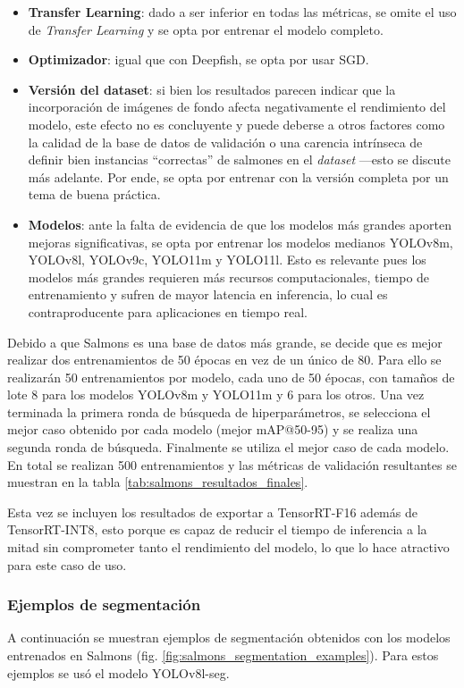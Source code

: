 \begin{itemize}
    \setlength{\itemsep}{0pt}%
    \item \textbf{Transfer Learning}: dado a ser inferior en todas las métricas, se omite el uso de \textit{Transfer Learning} y se opta por entrenar el modelo completo.
    \item \textbf{Optimizador}: igual que con Deepfish, se opta por usar SGD.
    \item \textbf{Versión del dataset}: si bien los resultados parecen indicar que la incorporación de imágenes de fondo afecta negativamente el rendimiento del modelo, este efecto no es concluyente y puede deberse a otros factores como la calidad de la base de datos de validación o una carencia intrínseca de definir bien instancias ``correctas'' de salmones en el \textit{dataset} ---esto se discute más adelante. Por ende, se opta por entrenar con la versión completa por un tema de buena práctica.
    \item \textbf{Modelos}: ante la falta de evidencia de que los modelos más grandes aporten mejoras significativas, se opta por entrenar los modelos medianos YOLOv8m, YOLOv8l, YOLOv9c, YOLO11m y YOLO11l. Esto es relevante pues los modelos más grandes requieren más recursos computacionales, tiempo de entrenamiento y sufren de mayor latencia en inferencia, lo cual es contraproducente para aplicaciones en tiempo real.
\end{itemize}

Debido a que Salmons es una base de datos más grande, se decide que es mejor realizar dos entrenamientos de 50 épocas en vez de un único de 80. Para ello se realizarán 50 entrenamientos por modelo, cada uno de 50 épocas, con tamaños de lote 8 para los modelos YOLOv8m y YOLO11m y 6 para los otros. Una vez terminada la primera ronda de búsqueda de hiperparámetros, se selecciona el mejor caso obtenido por cada modelo (mejor mAP@50-95) y se realiza una segunda ronda de búsqueda. Finalmente se utiliza el mejor caso de cada modelo. En total se realizan 500 entrenamientos y las métricas de validación resultantes se muestran en la tabla \ref{tab:salmons_resultados_finales}.

Esta vez se incluyen los resultados de exportar a TensorRT-F16 además de TensorRT-INT8, esto porque es capaz de reducir el tiempo de inferencia a la mitad sin comprometer tanto el rendimiento del modelo, lo que lo hace atractivo para este caso de uso.

\subsubsection{Ejemplos de segmentación}
A continuación se muestran ejemplos de segmentación obtenidos con los modelos entrenados en Salmons (fig. \ref{fig:salmons_segmentation_examples}). Para estos ejemplos se usó el modelo YOLOv8l-seg.

